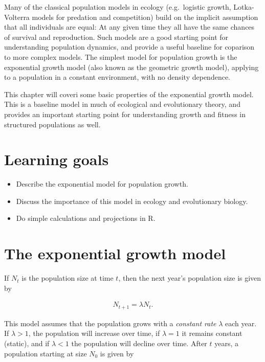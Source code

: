 \documentclass[
]{book}
\begin{document}
Many of the classical population models in ecology (e.g.~logistic growth, Lotka-Volterra models for predation and competition) build on the implicit assumption that all individuals are equal: At any given time they all have the same chances of survival and reproduction. Such models are a good starting point for understanding population dynamics, and provide a useful baseline for coparison to more complex models. The simplest model for population growth is the exponential growth model (also known as the geometric growth model), applying to a population in a constant environment, with no density dependence.

This chapter will coveri some basic properties of the exponential growth model. This is a baseline model in much of ecological and evolutionary theory, and provides an important starting point for understanding growth and fitness in structured populations as well.

\hypertarget{learning-goals}{%
\section{Learning goals}\label{learning-goals}}

\begin{itemize}
\item
  Describe the exponential model for population growth.
\item
  Discuss the importance of this model in ecology and evolutionary biology.
\item
  Do simple calculations and projections in R.
\end{itemize}

\hypertarget{the-exponential-growth-model}{%
\section{The exponential growth model}\label{the-exponential-growth-model}}

If \(N_t\) is the population size at time \(t\), then the next year's population size is given by

\begin{align}
N_{t+1}=\lambda N_t.
\label{eq:exp1}
\end{align}

This model assumes that the population grows with a \emph{constant rate} \(\lambda\) each year. If \(\lambda>1\), the population will increase over time, if \(\lambda=1\) it remains constant (static), and if \(\lambda<1\) the population will decline over time. After \(t\) years, a population starting at size \(N_0\) is given by
\end{document}
